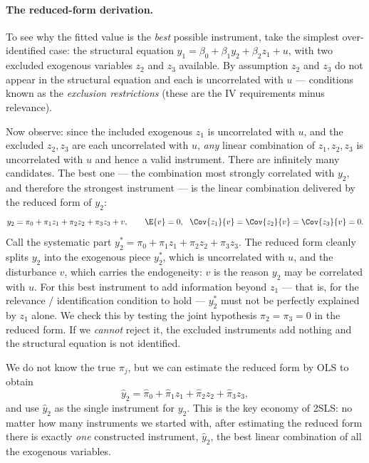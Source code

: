 \paragraph{The reduced-form derivation.} To see why the fitted value is the \emph{best} possible instrument, take the simplest over-identified case: the structural equation $y_1 = \beta_0 + \beta_1 y_2 + \beta_2 z_1 + u$, with two excluded exogenous variables $z_2$ and $z_3$ available. By assumption $z_2$ and $z_3$ do not appear in the structural equation and each is uncorrelated with $u$ --- conditions known as the \emph{exclusion restrictions} (these are the IV requirements minus relevance).

Now observe: since the included exogenous $z_1$ is uncorrelated with $u$, and the excluded $z_2,z_3$ are each uncorrelated with $u$, \emph{any} linear combination of $z_1,z_2,z_3$ is uncorrelated with $u$ and hence a valid instrument. There are infinitely many candidates. The best one --- the combination most strongly correlated with $y_2$, and therefore the strongest instrument --- is the linear combination delivered by the reduced form of $y_2$:
\[
y_2 = \pi_0 + \pi_1 z_1 + \pi_2 z_2 + \pi_3 z_3 + v,
\qquad \E{v}=0,\ \ \Cov{z_1}{v}=\Cov{z_2}{v}=\Cov{z_3}{v}=0.
\]
Call the systematic part $y_2^{*} = \pi_0 + \pi_1 z_1 + \pi_2 z_2 + \pi_3 z_3$. The reduced form cleanly splits $y_2$ into the exogenous piece $y_2^{*}$, which is uncorrelated with $u$, and the disturbance $v$, which carries the endogeneity: $v$ is the reason $y_2$ may be correlated with $u$. For this best instrument to add information beyond $z_1$ --- that is, for the relevance / identification condition to hold --- $y_2^{*}$ must not be perfectly explained by $z_1$ alone. We check this by testing the joint hypothesis $\pi_2 = \pi_3 = 0$ in the reduced form. If we \emph{cannot} reject it, the excluded instruments add nothing and the structural equation is not identified.

We do not know the true $\pi_j$, but we can estimate the reduced form by OLS to obtain
\[
\widehat y_2 = \widehat\pi_0 + \widehat\pi_1 z_1 + \widehat\pi_2 z_2 + \widehat\pi_3 z_3,
\]
and use $\widehat y_2$ as the single instrument for $y_2$. This is the key economy of 2SLS: no matter how many instruments we started with, after estimating the reduced form there is exactly \emph{one} constructed instrument, $\widehat y_2$, the best linear combination of all the exogenous variables.

